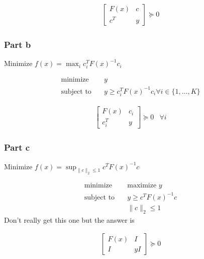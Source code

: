 \begin{align}
  \begin{bmatrix}
     F(x) & c \\
     c^T & y
  \end{bmatrix}
  \succeq 0 
\end{align}

\subsubsection{Part b}
Minimize $f(x) = \max_{i} c_i^T F(x)^{-1} c_i$ 

\begin{align}
  \text{minimize} & \quad y \\
  \text{subject to} & \quad y \geq c_i^T F(x)^{-1} c_i \forall i \in \{ 1, \dots, K \}
\end{align}

\begin{align}
  \begin{bmatrix}
     F(x) & c_i \\
     c_i^T & y
  \end{bmatrix}
  \succeq 0 & \forall i
\end{align}

\subsubsection{Part c}
Minimize $f(x) = \sup_{\| c \|_2 \leq 1} c^T F(x)^{-1} c$

\begin{align}
  \text{minimize} & \quad \text{maximize } y\\
  \text{subject to} & \quad y \geq c^T F(x)^{-1} c  \\
  & \quad \| c \|_2 \leq 1
\end{align}
Don't really get this one but the answer is

\begin{align}
  \begin{bmatrix}
     F(x) & I \\
     I & yI
  \end{bmatrix}
  \succeq 0 
\end{align}

